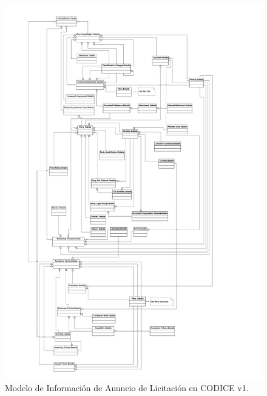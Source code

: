 \begin{figure}[!htb]
\centering
	\includegraphics[width=14cm]{images/phd/eproc/codice-1}
\caption{Modelo de Información de Anuncio de Licitación en CODICE v1.}
\label{fig:codice-1}
\end{figure}


